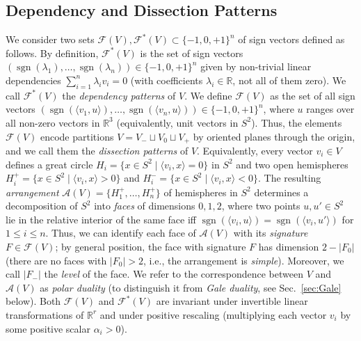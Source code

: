 \documentclass[11pt]{article}
\newcommand{\arr}{\mathcal{A}}
\DeclareMathOperator{\sgn}{sgn}
\renewcommand{\leq}{\leqslant}
\newcommand{\R}{\mathbb{R}}
\begin{document}
\subsection{Dependency and Dissection Patterns}
\label{sec:DepDiss}
We consider two sets $\mathcal{F}(V),\mathcal{F}^*(V) \subset \{-1,0,+1\}^n$ of sign vectors defined as follows. 
%
By definition, $\mathcal{F}^*(V)$ is the set of sign vectors $(\sgn(\lambda_1),\dots,\sgn(\lambda_n)) \in \{-1,0,+1\}^n$ given by non-trivial linear dependencies $\sum_{i=1}^n \lambda_i v_i=0$ (with coefficients $\lambda_i\in \R$, not all of them zero). We call $\mathcal{F}^*(V)$ the \emph{dependency patterns} of $V$.
%
We define $\mathcal{F}(V)$ as the set of all sign vectors $(\sgn(\langle v_1,u\rangle),\dots,\sgn(\langle v_n,u\rangle)) \in \{-1,0,+1\}^n$, where $u$ ranges over all non-zero vectors in $\R^3$ (equivalently, unit vectors in $S^2$). Thus, the elements $\mathcal{F}(V)$ encode partitions $V=V_-\sqcup V_0 \sqcup V_+$ by oriented planes through the origin, and we call them the \emph{dissection patterns} of $V$. Equivalently, every vector $v_i \in V$ defines a great circle 
$
H_i = \{ x \in S^2 \mid \langle v_i, x \rangle = 0 \}
$
in $S^2$ and two open hemispheres $H_i^+ = \{ x \in S^2 \mid \langle v_i, x \rangle >0 \}$ and $H_i^- = \{ x \in S^2 \mid \langle v_i, x \rangle < 0 \}.$
The resulting \emph{arrangement} $\arr(V)=\{H_1^+,\dots,H_n^+\}$ of hemispheres in $S^2$ determines a decomposition of $S^2$ into \emph{faces} of dimensions $0,1,2$, 
where two points $u,u'\in S^2$ lie in the relative interior of the same face iff $\sgn(\langle v_i,u \rangle)=\sgn(\langle v_i,u'\rangle)$ for $1\leq i\leq n$. Thus, we can identify each face of $\arr(V)$ with its \emph{signature} $F\in \mathcal{F}(V)$; by general position, the face with signature $F$ has dimension $2-|F_0|$ (there are no faces with $|F_0|>2$, i.e., the arrangement is \emph{simple}). Moreover, we call $|F_-|$ the \emph{level} of the face. We 
refer to the correspondence between $V$ and $\mathcal{A}(V)$ as \emph{polar duality} (to distinguish it from \emph{Gale duality}, see Sec.~\ref{sec:Gale} below).
%
Both $\mathcal{F}(V)$ and $\mathcal{F}^*(V)$ are invariant under invertible linear transformations of $\R^r$ and under positive rescaling (multiplying each vector $v_i$ by some positive scalar $\alpha_i>0$).
%
\end{document}
